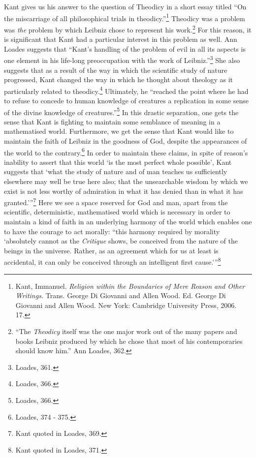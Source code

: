 \documentclass[12pt]{article}
\begin{document}
	Kant gives us his answer to the question of Theodicy in a short essay titled ``On the miscarriage of all philosophical trials in theodicy.''\footnote{Kant, Immanuel. \emph{Religion within the Boundaries of Mere Reason and Other Writings.} Trans. George Di Giovanni and Allen Wood. Ed. George Di Giovanni and Allen Wood. New York: Cambridge University Press, 2006. 17.} Theodicy was a problem was \emph{the} problem by which Leibniz chose to represent his work.\footnote{``The \emph{Theodicy} itself was the one major work out of the many papers and books Leibniz produced by which he chose that most of his contemporaries should know him.'' Ann Loades, 362.} For this reason, it is significant that Kant had a particular interest in this problem as well. Ann Loades suggests that ``Kant's handling of the problem of evil in all its aspects is one element in his life-long preoccupation with the work of Leibniz.''\footnote{Loades, 361.} She also suggests that as a result of the way in which the scientific study of nature progressed, Kant changed the way in which he thought about theology as it particularly related to theodicy.\footnote{Loades, 366.} Ultimately, he ``reached the point where he had to refuse to concede to human knowledge of creatures a replication in some sense of the divine knowledge of creatures.''\footnote{Loades, 366.} In this drastic separation, one gets the sense that Kant is fighting to maintain some semblance of meaning in a mathematised world. Furthermore, we get the sense that Kant would like to maintain the faith of Leibniz in the goodness of God, despite the appearances of the world to the contrary.\footnote{Loades, 374 - 375.} In order to maintain these claims, in spite of reason's inability to assert that this world `is the most perfect whole possible', Kant suggests that `what the study of nature and of man teaches us sufficiently elsewhere may well be true here also; that the unsearchable wisdom by which we exist is not less worthy of admiration in what it has denied than in what it has granted.'\thinspace''\footnote{Kant quoted in Loades, 369.}  Here we see a space reserved for God and man, apart from the scientific, deterministic, mathematised world which is necessary in order to maintain a kind of faith in an underlying harmony of the world which enables one to have the courage to act morally: ``this harmony required by morality `absolutely cannot as the \emph{Critique} shows, be conceived from the nature of the beings in the universe. Rather, as an agreement which for us at least is accidental, it can only be conceived through an intelligent first cause.'\thinspace''\footnote{Kant quoted in Loades, 371.} 
	
\end{document}
